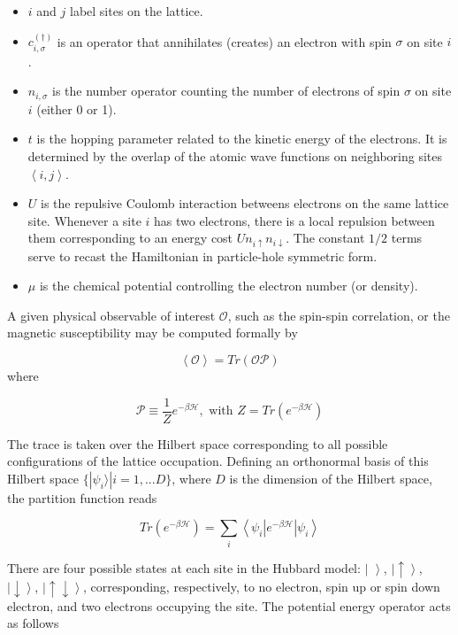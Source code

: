 \documentclass[10pt, twocolumn, twoside]{article}
\begin{document}
\begin{itemize}
\item $i$ and $j$ label sites on the lattice.
\item $c_{i,\sigma}^{(\dagger)}$ is an operator that annihilates (creates) an electron with spin $\sigma$ on site $i$.
\item $n_{i,\sigma}$ is the number operator counting the number of electrons of spin $\sigma$ on site $i$ (either 0 or 1).
\item $t$ is the hopping parameter related to the kinetic energy of the electrons. It is determined by the overlap of the atomic wave functions on neighboring sites $\left\langle i, j \right\rangle$.
\item $U$ is the repulsive Coulomb interaction betweens electrons on the same lattice site. Whenever a site $i$ has two electrons, there is a local repulsion between them corresponding to an energy cost $U n_{i \uparrow} n_{i \downarrow}$. The constant $1/2$ terms serve to recast the Hamiltonian in particle-hole symmetric form.
\item $\mu$ is the chemical potential controlling the electron number (or density).
\end{itemize}

A given physical observable of interest $\mathcal{O}$, such as the spin-spin correlation, or the magnetic susceptibility may be computed formally by

\begin{equation}
\left\langle \mathcal{O} \right\rangle = Tr ( \mathcal{O} \mathcal{P} )
\end{equation}
where

\begin{equation}
\mathcal{P} \equiv \frac{1}{Z} e^{-\beta \mathcal{H} } , \text{ with } Z = Tr ( e^{-\beta \mathcal{H} } )
\end{equation}

The trace is taken over the Hilbert space corresponding to all possible configurations of the lattice occupation. Defining an orthonormal basis of this Hilbert space $\{ | \psi_i \rangle | i = 1, ... D \} $, where $D$ is the dimension of the Hilbert space, the partition function reads

\begin{equation}
Tr ( e^{-\beta \mathcal{H} } )= \sum_i \left\langle \psi_i | e^{-\beta \mathcal{H} } | \psi_i \right\rangle
\end{equation}

There are four possible states at each site in the Hubbard model: $\left| \,\, \right\rangle$, $\left|\uparrow \right\rangle$, $\left|\downarrow\right \rangle$, $\left|\uparrow \downarrow \right\rangle $, corresponding, respectively, to no electron, spin up or spin down electron, and two electrons occupying the site. The potential energy operator acts as follows
\end{document}

